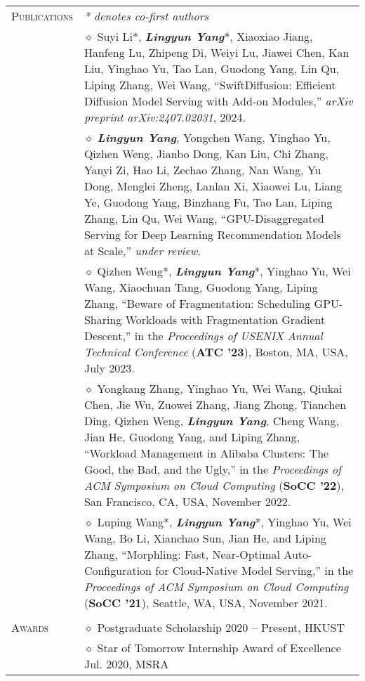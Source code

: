 \documentclass[letterpaper, 10pt]{article}
\begin{document}
\begin{longtable}{p{0.7in}p{6.0in}}
\nohyphens{\textsc{Publications}}
& \textit{* denotes co-first authors} \\
& $\diamond$ Suyi Li*, \textbf{\emph{Lingyun Yang}}*, Xiaoxiao Jiang, Hanfeng Lu, Zhipeng Di, Weiyi Lu, Jiawei Chen, Kan Liu, Yinghao Yu, Tao Lan, Guodong Yang, Lin Qu, Liping Zhang, Wei Wang, “SwiftDiffusion: Efficient Diffusion Model Serving with Add-on Modules,” \textit{arXiv preprint arXiv:2407.02031}, 2024. \\
& $\diamond$ \textbf{\emph{Lingyun Yang}}, Yongchen Wang, Yinghao Yu, Qizhen Weng, Jianbo Dong, Kan Liu, Chi Zhang, Yanyi Zi, Hao Li, Zechao Zhang, Nan Wang, Yu Dong, Menglei Zheng, Lanlan Xi, Xiaowei Lu, Liang Ye, Guodong Yang, Binzhang Fu, Tao Lan, Liping Zhang, Lin Qu, Wei Wang, “GPU-Disaggregated Serving for Deep Learning Recommendation Models at Scale,” \textit{under review}. \\
& $\diamond$ Qizhen Weng*, \textbf{\emph{Lingyun Yang}}*, Yinghao Yu, Wei Wang, Xiaochuan Tang, Guodong Yang, Liping Zhang, “Beware of Fragmentation: Scheduling GPU-Sharing Workloads with Fragmentation Gradient Descent,” in the \textit{Proceedings of USENIX Annual Technical Conference} (\textbf{ATC '23}), Boston, MA, USA, July 2023. \\
& $\diamond$ Yongkang Zhang, Yinghao Yu, Wei Wang, Qiukai Chen, Jie Wu, Zuowei Zhang, Jiang Zhong, Tianchen Ding, Qizhen Weng, \textbf{\emph{Lingyun Yang}}, Cheng Wang, Jian He, Guodong Yang, and Liping Zhang, “Workload Management in Alibaba Clusters: The Good, the Bad, and the Ugly,” in the \textit{Proceedings of ACM Symposium on Cloud Computing} (\textbf{SoCC '22}), San Francisco, CA, USA, November 2022. \\
& $\diamond$ Luping Wang*, \textbf{\emph{Lingyun Yang}}*, Yinghao Yu, Wei Wang, Bo Li, Xianchao Sun, Jian He, and Liping Zhang, “Morphling: Fast, Near-Optimal Auto-Configuration for Cloud-Native Model Serving,” in the \textit{Proceedings of ACM Symposium on Cloud Computing} (\textbf{SoCC '21}), Seattle, WA, USA, November 2021. \\
& \\

\nohyphens{\textsc{Awards}}
& $\diamond$ Postgraduate Scholarship \hfill 2020 -- Present, HKUST \\
& $\diamond$ Star of Tomorrow Internship Award of Excellence \hfill Jul. 2020, MSRA \\


\end{longtable}
\end{document}

